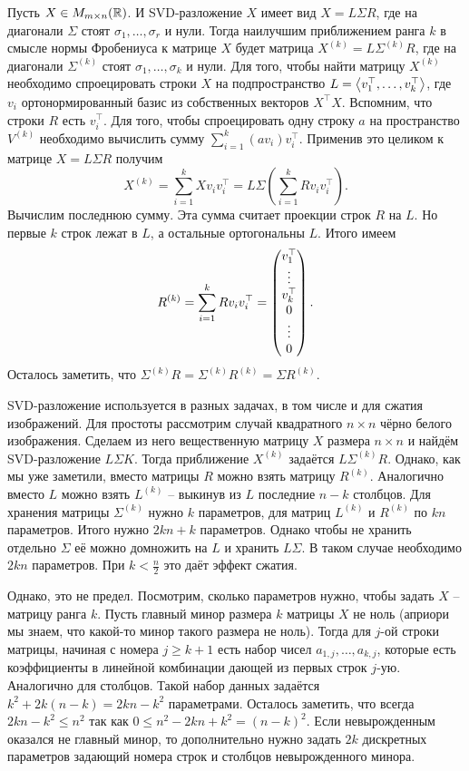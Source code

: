 \thrm Пусть $X\in M_{m\times n}(\mathbb{R})$. И SVD-разложение $X$ имеет вид $X=L\Sigma R$, где на диагонали $\Sigma$ стоят $\sigma_1,\dots,\sigma_r$ и нули. Тогда наилучшим приближением ранга $k$ в смысле нормы Фробениуса к матрице $X$ будет матрица $X^{(k)}=L\Sigma^{(k)}R$, где на диагонали $\Sigma^{(k)}$ стоят $\sigma_1,\dots,\sigma_{k}$ и нули.
\proof Для того, чтобы найти матрицу $X^{(k)}$ необходимо спроецировать строки $X$ на подпространство $L=\left\langle v_1^{\top},\dots,v_k^{\top}\right\rangle$, где $v_i$ ортонормированный базис из собственных векторов $X^{\top}X$.  Вспомним, что строки $R$ есть $v_i^{\top}$. Для того, чтобы спроецировать одну строку $a$ на пространство $V^{(k)}$ необходимо вычислить сумму $\sum_{i=1}^k (av_i)v_i^{\top}$. Применив это целиком к матрице $X=L\Sigma R$ получим 
$$X^{(k)}=\sum_{i=1}^k Xv_iv_i^{\top}=L\Sigma \left(\sum_{i=1}^k Rv_iv_i^{\top}\right).$$
Вычислим последнюю сумму. Эта сумма считает проекции строк $R$ на $L$. Но первые $k$ строк лежат в $L$, а остальные ортогональны $L$. Итого имеем
$$R^{(k)}=\sum_{i=1}^k Rv_iv_i^{\top} = \begin{pmatrix} v_1^{\top} \\ \vdots \\ v_k^{\top} \\ 0 \\ \vdots \\ 0 \end{pmatrix}.$$
Осталось заметить, что $\Sigma^{(k)} R= \Sigma^{(k)}R^{(k)}=\Sigma R^{(k)}$.
\endproof
\ethrm 

SVD-разложение используется в разных задачах, в том числе и для сжатия изображений.  Для простоты рассмотрим случай квадратного $n \times n$ чёрно белого изображения. Сделаем из него вещественную матрицу $X$ размера $n \times n$ и найдём SVD-разложение $L \Sigma K$. Тогда приближение $X^{(k)}$ задаётся $L\Sigma^{(k)}R$. Однако, как мы уже заметили, вместо матрицы $R$ можно взять матрицу $R^{(k)}$. Аналогично вместо $L$ можно взять $L^{(k)}$ -- выкинув из $L$ последние $n-k$ столбцов. Для хранения матрицы $\Sigma^{(k)}$ нужно $k$ параметров, для матриц $L^{(k)}$ и $R^{(k)}$ по $kn$ параметров. Итого нужно $2kn+k$ параметров. Однако чтобы не хранить отдельно $\Sigma$ её можно домножить на $L$ и хранить $L\Sigma$. В таком случае необходимо $2kn$ параметров. При $k<\frac{n}{2}$ это даёт эффект сжатия. 

Однако, это не предел. Посмотрим, сколько параметров нужно, чтобы задать $X$ -- матрицу ранга $k$. Пусть главный минор размера $k$ матрицы $X$ не ноль (априори мы знаем, что какой-то минор такого размера не ноль). Тогда для $j$-ой строки матрицы, начиная с номера $j \geq k+1$ есть набор чисел $a_{1,j},\dots,a_{k,j}$, которые есть коэффициенты в линейной комбинации дающей из первых строк $j$-ую. Аналогично для столбцов. Такой набор данных задаётся $k^2+ 2k(n-k)=2kn-k^2$ параметрами. Осталось заметить, что всегда $2kn - k^2\leq n^2$ так как $0\leq n^2-2kn+k^2=(n-k)^2$. Если невырожденным оказался не главный минор, то дополнительно нужно задать $2k$ дискретных параметров задающий номера строк и столбцов невырожденного минора.

